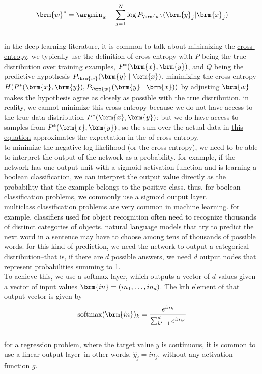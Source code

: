 \documentclass[a4paper,12pt]{article}
\begin{document}
\[
\brm{w}^* = \argmin_w - \sum_{j=1}^{N} \log P_{\brm{w}}(\brm{y}_j|\brm{x}_j)
\]\\
in the deep learning literature, it is common to talk about minimizing the \href{20230503184620-cross_entropy.org}{cross-entropy}. we typically use the definition of cross-entropy with \(P\) being the true distribution over training examples, \(P^*(\brm{x},\brm{y})\), and \(Q\) being the predictive hypothesis \(P_{\brm{w}}(\brm{y} \mid \brm{x})\). minimizing the cross-entropy \(H(P^*(\brm{x},\brm{y}), P_{\brm{w}}(\brm{y} \mid \brm{x}))\) by adjusting \(\brm{w}\) makes the hypothesis agree as closely as possible with the true distribution. in reality, we cannot minimize this cross-entropy because we do not have access to the true data distribution \(P^*(\brm{x},\brm{y})\); but we do have access to samples from \(P^*(\brm{x},\brm{y})\), so the sum over the actual data in \hyperref[org66a575e]{this equation} approximates the expectation in the of cross-entropy.\\
to minimize the negative log likelihood (or the cross-entropy), we need to be able to interpret the output of the network as a probability. for example, if the network has one output unit with a sigmoid activation function and is learning a boolean classification, we can interpret the output value directly as the probability that the example belongs to the positive class. thus, for boolean classification problems, we commonly use a sigmoid output layer.\\
multiclass classification problems are very common in machine learning. for example, classifiers used for object recognition often need to recognize thousands of distinct categories of objects. natural language models that try to predict the next word in a sentence may have to choose among tens of thousands of possible words. for this kind of prediction, we need the network to output a categorical distribution--that is, if there are \(d\) possible answers, we need \(d\) output nodes that represent probabilities summing to 1.\\
To achieve this, we use a softmax layer, which outputs a vector of \(d\) values given a vector of input values \(\brm{in}=(in_1,\dots,in_d)\). The kth element of that output vector is given by\\
\[
\mathrm{softmax}(\brm{in})_k = \frac{e^{in_k}}{\sum_{k'=1}^{d} e^{in_{k'}}}
\]\\
for a regression problem, where the target value \(y\) is continuous, it is common to use a linear output layer--in other words, \(\hat y_j=in_j\), without any activation function \(g\).\\
\end{document}
